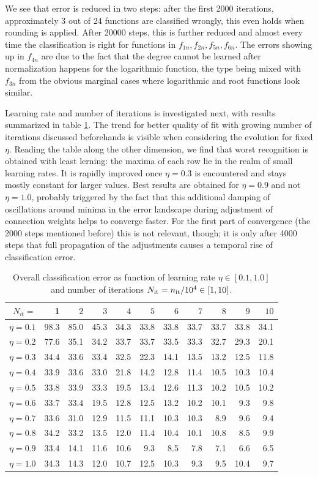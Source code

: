 \documentclass[useAMS,usenatbib]{mn2e}
\begin{document}
%
We see that error is reduced in two steps: after the first 2000
iterations, approximately 3 out of 24 functions are classified
wrongly, this even holds when rounding is applied. After 20000 steps,
this is further reduced and almost every time the classification is
right for functions in $f_{1n},f_{2n},f_{5n},f_{6n}$. The errors
showing up in $f_{4n}$ are due to the fact that the degree cannot be
learned after normalization happens for the logarithmic function, the
type being mixed with $f_{3n}$ from the obvious marginal cases where
logarithmic and root functions look similar.

Learning rate and number of iterations is investigated next, with
results summarized in table \ref{tab:qof}. The trend for better
quality of fit with growing number of iterations discussed beforehands
is visible when considering the evolution for fixed $\eta$. Reading
the table along the other dimension, we find that worst recognition is
obtained with least lerning: the maxima of each row lie in the realm
of small learning rates. It is rapidly improved once $\eta=0.3$ is
encountered and stays mostly constant for larger values. Best results
are obtained for $\eta=0.9$ and not $\eta=1.0$, probably triggered by
the fact that this additional damping of oscillations around minima in
the error landscape during adjustment of connection weights helps to
converge faster. For the first part of convergence (the 2000 steps
mentioned before) this is not relevant, though; it is only after 4000
steps that full propagation of the adjustments causes a temporal rise
of classification error.
\begin{table}
\begin{center}
\begin{tabular}{r|rrrrrrrrrr}\hline\hline
$N_{it}=$&1&$2$&$3$&$4$&$5$&$6$&$7$&$8$&$9$&$10$\\
\hline
$\eta=0.1$&98.3&85.0&45.3&34.3&33.8&33.8&33.7&33.7&33.8&34.1\\
$\eta=0.2$&77.6&35.1&34.2&33.7&33.7&33.5&33.3&32.7&29.3&20.1\\
$\eta=0.3$&34.4&33.6&33.4&32.5&22.3&14.1&13.5&13.2&12.5&11.8\\
$\eta=0.4$&33.9&33.6&33.0&21.8&14.2&12.8&11.4&10.5&10.3&10.4\\
$\eta=0.5$&33.8&33.9&33.3&19.5&13.4&12.6&11.3&10.2&10.5&10.2\\
$\eta=0.6$&33.7&33.4&19.5&12.8&12.5&13.2&10.2&10.1& 9.3& 9.8\\
$\eta=0.7$&33.6&31.0&12.9&11.5&11.1&10.3&10.3& 8.9& 9.6& 9.4\\
$\eta=0.8$&34.2&33.2&13.5&12.0&11.4&10.4&10.1&10.8& 8.5& 9.9\\
$\eta=0.9$&33.4&14.1&11.6&10.6& 9.3& 8.5& 7.8& 7.1& 6.6& 6.5\\
$\eta=1.0$&34.3&14.3&12.0&10.7&12.5&10.3& 9.3& 9.5&10.4& 9.7\\
\hline
\end{tabular}
\end{center}
\caption{\label{tab:qof}Overall classification error as function of learning rate $\eta\in[0.1,1.0]$ and number of iterations $N_{{\rm it}}=n_{{\rm it}}/10^4\in[1,10]$.}
\end{table}
%
\end{document}
